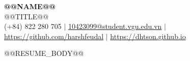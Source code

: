 \documentclass[a4paper,10pt]{article}
\begin{document}
\begin{center}
  {\Huge \bfseries @@NAME@@}\\ \vspace{2pt}
  \small @@TITLE@@\\
  \vspace{2pt}
  \small (+84) 822 280 705 $\vert$
  \href{mailto:10423099@student.vgu.edu.vn}{10423099@student.vgu.edu.vn} $\vert$
  \href{https://github.com/harshfeudal}{https://github.com/harshfeudal} $\vert$
  \href{https://dhtson.github.io}{https://dhtson.github.io}
\end{center}

@@RESUME_BODY@@
\end{document}
